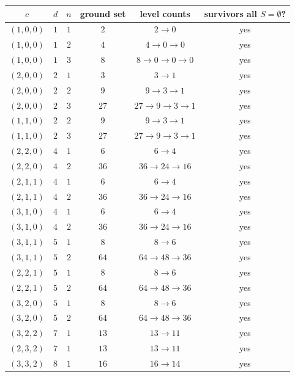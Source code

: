 \documentclass[11pt]{article}
\theoremstyle{plain}
\theoremstyle{definition}
\begin{document}
\begin{center}
\begin{tabular}{c|c|c|c|c|c}
$c$ & $d$ & $n$ &
  \textbf{ground set} &
  \textbf{level counts} &
  \textbf{survivors all $S{=}\emptyset$?} \\ \hline
$(1,0,0)$ & $1$ & $1$ & $2$ &
  $2 \to 0$ & yes \\
$(1,0,0)$ & $1$ & $2$ & $4$ &
  $4 \to 0 \to 0$ & yes \\
$(1,0,0)$ & $1$ & $3$ & $8$ &
  $8 \to 0 \to 0 \to 0$ & yes \\
\hline
$(2,0,0)$ & $2$ & $1$ & $3$ &
  $3 \to 1$ & yes \\
$(2,0,0)$ & $2$ & $2$ & $9$ &
  $9 \to 3 \to 1$ & yes \\
$(2,0,0)$ & $2$ & $3$ & $27$ &
  $27 \to 9 \to 3 \to 1$ & yes \\
$(1,1,0)$ & $2$ & $2$ & $9$ &
  $9 \to 3 \to 1$ & yes \\
$(1,1,0)$ & $2$ & $3$ & $27$ &
  $27 \to 9 \to 3 \to 1$ & yes \\
\hline
$(2,2,0)$ & $4$ & $1$ & $6$ &
  $6 \to 4$ & yes \\
$(2,2,0)$ & $4$ & $2$ & $36$ &
  $36 \to 24 \to 16$ & yes \\
$(2,1,1)$ & $4$ & $1$ & $6$ &
  $6 \to 4$ & yes \\
$(2,1,1)$ & $4$ & $2$ & $36$ &
  $36 \to 24 \to 16$ & yes \\
$(3,1,0)$ & $4$ & $1$ & $6$ &
  $6 \to 4$ & yes \\
$(3,1,0)$ & $4$ & $2$ & $36$ &
  $36 \to 24 \to 16$ & yes \\
\hline
$(3,1,1)$ & $5$ & $1$ & $8$ &
  $8 \to 6$ & yes \\
$(3,1,1)$ & $5$ & $2$ & $64$ &
  $64 \to 48 \to 36$ & yes \\
$(2,2,1)$ & $5$ & $1$ & $8$ &
  $8 \to 6$ & yes \\
$(2,2,1)$ & $5$ & $2$ & $64$ &
  $64 \to 48 \to 36$ & yes \\
$(3,2,0)$ & $5$ & $1$ & $8$ &
  $8 \to 6$ & yes \\
$(3,2,0)$ & $5$ & $2$ & $64$ &
  $64 \to 48 \to 36$ & yes \\
\hline
$(3,2,2)$ & $7$ & $1$ & $13$ &
  $13 \to 11$ & yes \\
$(2,3,2)$ & $7$ & $1$ & $13$ &
  $13 \to 11$ & yes \\
\hline
$(3,3,2)$ & $8$ & $1$ & $16$ &
  $16 \to 14$ & yes \\
\end{tabular}
\end{center}
\end{document}
